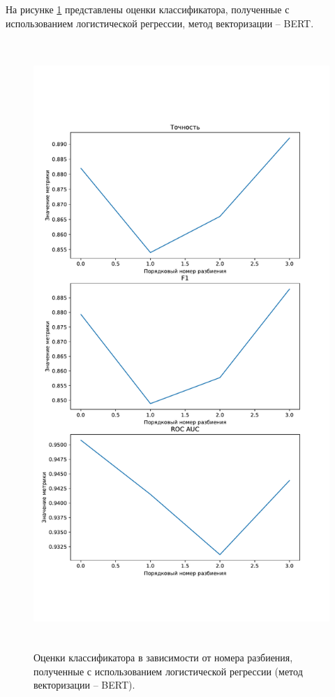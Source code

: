 На рисунке \ref{img:logicMetricsBert} представлены оценки классификатора, полученные с использованием логистической регрессии, метод векторизации -- BERT.
\begin{figure}[H]
	\centering
	\includegraphics[height=23cm]{inc/plots/logicMetricsBert.pdf}
	\caption{ Оценки классификатора в зависимости от номера разбиения, полученные с использованием логистической регрессии (метод векторизации -- BERT). }
	\label{img:logicMetricsBert}
\end{figure}



